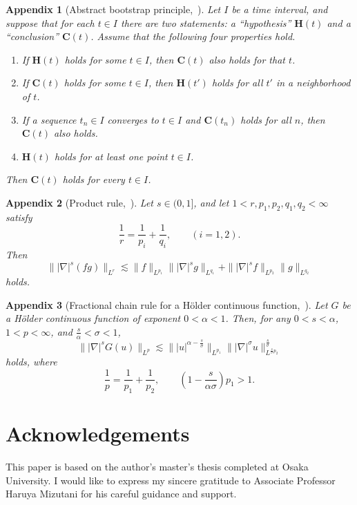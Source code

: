 \documentclass[11pt,a4paper]{article}
\numberwithin{equation}{section}
\newtheorem{app}{Appendix}[section]
\begin{document}
\begin{app}[Abstract bootstrap principle,\ \cite{Tao}]\label{bootstrap}
Let $I$ be a time interval, and suppose that for each $t \in I$ there are two statements: a ``hypothesis'' $\textbf{H}(t)$ and a ``conclusion'' $\textbf{C}(t)$.
Assume that the following four properties hold.
\begin{enumerate}
\item[(a)] If $\textbf{H}(t)$ holds for some $t \in I$, then $\textbf{C}(t)$ also holds for that $t$.
\item[(b)] If $\textbf{C}(t)$ holds for some $t \in I$, then $\textbf{H}(t')$ holds for all $t'$ in a neighborhood of $t$.
\item[(d)] If a sequence $t_{n} \in I$ converges to $t \in I$ and $\textbf{C}(t_{n})$ holds for all $n$, then $\textbf{C}(t)$ also holds.
\item[(e)] $\textbf{H}(t)$ holds for at least one point $t \in I$.
\end{enumerate}
Then $\textbf{C}(t)$ holds for every $t \in I$.
\end{app}

\begin{app}[Product rule,\ \cite{Christ}]\label{Product rule}
Let $s \in (0, 1]$, and let $1 < r, p_{1}, p_{2}, q_{1}, q_{2} < \infty$ satisfy
\[
\frac{1}{r} = \frac{1}{p_{i}} + \frac{1}{q_{i}},\qquad (i = 1, 2).
\]
Then
\[
 \||\nabla|^{s}(fg)\|_{L^{r}} \lesssim \|f\|_{L^{p_{1}}} \||\nabla|^{s}g\|_{L^{q_{1}}} + \||\nabla|^{s}f\|_{L^{p_{2}}}\|g\|_{L^{q_{2}}}
\]
holds.
\end{app}

\begin{app}[Fractional chain rule for a H\"older continuous function,\ \cite{visan}]\label{chain}
Let $G$ be a H\"older continuous function of exponent $0 < \alpha < 1$.
Then, for any $0 < s < \alpha$, $1 < p < \infty$, and $\frac{s}{\alpha} < \sigma < 1$,
\[
 \||\nabla|^{s}G(u)\|_{L^{p}} \lesssim \||u|^{\alpha - \frac{s}{\sigma}}\|_{L^{p_{1}}}\||\nabla|^{\sigma}u\|_{L^{\frac{s}{\sigma}p_{2}}}^{\frac{s}{\sigma}}
\]
holds, where
\[
\frac{1}{p} = \frac{1}{p_{1}} + \frac{1}{p_{2}},\qquad \left(1 - \frac{s}{\alpha \sigma}\right)p_{1} > 1.
\]
\end{app}


\section*{Acknowledgements}
This paper is based on the author's master's thesis completed at Osaka University. I would like to express my sincere gratitude to Associate Professor Haruya Mizutani for his careful guidance and support.
\end{document}
